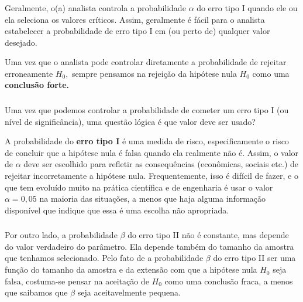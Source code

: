 \documentclass[14pt,aspectratio=1610]{beamer}
\newcommand{\Ho}{\ensuremath{H_{0}}}
\begin{document}
\begin{frame}{}
\frametitle{}
\begin{block}{}
\justifying
Geralmente, o(a) analista controla a probabilidade $\alpha$ do erro tipo I quando ele ou ela seleciona os valores críticos. Assim, geralmente é fácil para o analista 
estabelecer a probabilidade de erro tipo I em (ou perto de) qualquer valor desejado. 
\end{block}
\pause
\begin{block}{}
\justifying
Uma vez que o analista pode controlar diretamente a probabilidade de rejeitar erroneamente $\Ho,$ sempre pensamos na rejeição da hipótese nula $\Ho$ como uma 
\textbf{conclusão forte.}
\end{block}
\end{frame}

\begin{frame}{}
\frametitle{}
\begin{block}{}
\justifying
Uma vez que podemos controlar a probabilidade de cometer um erro tipo I (ou nível de significância), uma questão lógica é que valor deve ser usado?
\end{block}
\pause
\begin{block}{}
\justifying
A probabilidade do \textbf{erro tipo I} é uma medida de risco, especificamente o risco de concluir que a hipótese nula é falsa quando ela realmente não é. Assim, o valor 
de $\alpha$ deve ser escolhido para refletir as consequências (econômicas, sociais etc.) de rejeitar incorretamente a hipótese nula. Frequentemente, isso é difícil de fazer, 
e o que tem evoluído muito na prática científica e de engenharia é usar o valor $\alpha = 0,05$ na maioria das situações, a menos que haja alguma informação disponível 
que indique que essa é uma escolha não apropriada. 
\end{block}
\end{frame}

\begin{frame}{}
\frametitle{}
\begin{block}{}
\justifying
Por outro lado, a probabilidade $\beta$ do erro tipo II não é constante, mas depende do valor verdadeiro do parâmetro. Ela depende também do tamanho da amostra 
que tenhamos selecionado. Pelo fato de a probabilidade $\beta$ do erro tipo II ser uma função do tamanho da amostra e da extensão com que a hipótese nula $\Ho$ 
seja falsa, costuma-se pensar na aceitação de $\Ho$ como uma conclusão fraca, a menos que saibamos que $\beta$ seja aceitavelmente pequena. 
\end{block}
\end{frame}
\end{document}
